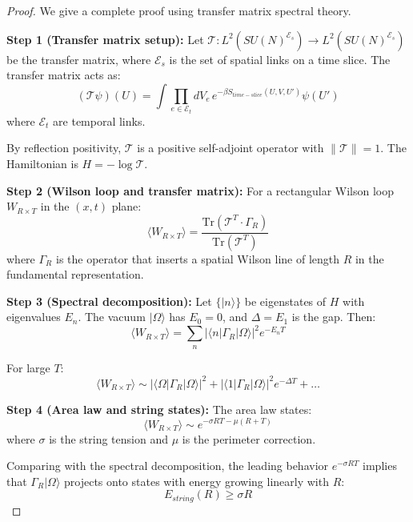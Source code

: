 \begin{proof}
We give a complete proof using transfer matrix spectral theory.

\textbf{Step 1 (Transfer matrix setup):}
Let $\mathcal{T}: L^2(SU(N)^{\mathcal{E}_s}) \to L^2(SU(N)^{\mathcal{E}_s})$ be the transfer matrix, where $\mathcal{E}_s$ is the set of spatial links on a time slice. The transfer matrix acts as:
\begin{equation}
(\mathcal{T}\psi)(U) = \int \prod_{e \in \mathcal{E}_t} dV_e \, e^{-\beta S_{time-slice}(U,V,U')} \psi(U')
\end{equation}
where $\mathcal{E}_t$ are temporal links.

By reflection positivity, $\mathcal{T}$ is a positive self-adjoint operator with $\|\mathcal{T}\| = 1$. The Hamiltonian is $H = -\log \mathcal{T}$.

\textbf{Step 2 (Wilson loop and transfer matrix):}
For a rectangular Wilson loop $W_{R \times T}$ in the $(x,t)$ plane:
\begin{equation}
\langle W_{R \times T} \rangle = \frac{\mathrm{Tr}(\mathcal{T}^T \cdot \Gamma_R)}{\mathrm{Tr}(\mathcal{T}^T)}
\end{equation}
where $\Gamma_R$ is the operator that inserts a spatial Wilson line of length $R$ in the fundamental representation.

\textbf{Step 3 (Spectral decomposition):}
Let $\{|n\rangle\}$ be eigenstates of $H$ with eigenvalues $E_n$. The vacuum $|\Omega\rangle$ has $E_0 = 0$, and $\Delta = E_1$ is the gap. Then:
\begin{equation}
\langle W_{R \times T} \rangle = \sum_n |\langle n | \Gamma_R | \Omega \rangle|^2 e^{-E_n T}
\end{equation}

For large $T$:
\begin{equation}
\langle W_{R \times T} \rangle \sim |\langle \Omega | \Gamma_R | \Omega \rangle|^2 + |\langle 1 | \Gamma_R | \Omega \rangle|^2 e^{-\Delta T} + \ldots
\end{equation}

\textbf{Step 4 (Area law and string states):}
The area law states:
\begin{equation}
\langle W_{R \times T} \rangle \sim e^{-\sigma R T - \mu(R + T)}
\end{equation}
where $\sigma$ is the string tension and $\mu$ is the perimeter correction.

Comparing with the spectral decomposition, the leading behavior $e^{-\sigma R T}$ implies that $\Gamma_R|\Omega\rangle$ projects onto states with energy growing linearly with $R$:
\begin{equation}
E_{string}(R) \geq \sigma R
\end{equation}


\end{proof}
